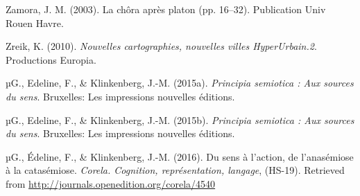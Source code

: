 \documentclass[
  a4paper,
  DIV=11,
  numbers=noendperiod]{scrreprt}
\newlength{\cslhangindent}
\newenvironment{CSLReferences}[2] %
 {\begin{list}{}{%
  \setlength{\itemindent}{0pt}
  \setlength{\leftmargin}{0pt}
  \setlength{\parsep}{0pt}
  \ifodd #1
   \setlength{\leftmargin}{\cslhangindent}
   \setlength{\itemindent}{-1\cslhangindent}
  \fi
  \setlength{\itemsep}{#2\baselineskip}}}
 {\end{list}}
\begin{document}
\begin{CSLReferences}{1}{0}
Zamora, J. M. (2003). La chôra après platon (pp. 16--32). Publication
Univ Rouen Havre.

Zreik, K. (2010). \emph{Nouvelles cartographies, nouvelles villes
HyperUrbain.2}. Productions Europia.

µG., Edeline, F., \& Klinkenberg, J.-M. (2015a). \emph{Principia
semiotica : Aux sources du sens}. Bruxelles: Les impressions nouvelles
éditions.

µG., Edeline, F., \& Klinkenberg, J.-M. (2015b). \emph{Principia
semiotica : Aux sources du sens}. Bruxelles: Les impressions nouvelles
éditions.

µG., Édeline, F., \& Klinkenberg, J.-M. (2016). Du sens à l{'}action, de
l{'}anasémiose à la catasémiose. \emph{Corela. Cognition,
représentation, langage}, (HS-19). Retrieved from
\url{http://journals.openedition.org/corela/4540}

\end{CSLReferences}
\end{document}
